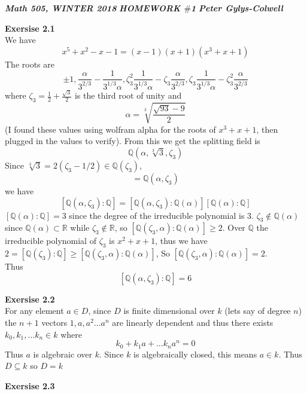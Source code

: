 \documentclass[12pt]{article}
\newenvironment{ques}[1]{\textbf{Exersise #1}\vspace{1 mm}\\ }{\bigskip}
\theoremstyle{definition}
\newcommand{\R}{\mathbb R}
\newcommand{\Q}{\mathbb Q}
\renewcommand{\a}{\alpha}
\begin{document}
\noindent \textit{\textbf{Math 505, WINTER 2018}} \hspace{1.3cm}
\textit{\textbf{HOMEWORK $\#$1}} \hspace{1.3cm} \textit{\textbf{Peter
Gylys-Colwell}} 

\vspace{1cm}

\begin{ques}{2.1}
	We have
	$$x^5 + x^2 - x - 1 = (x - 1)(x + 1)(x^3 + x + 1)$$
	The roots are 
	$$\pm 1, \frac{\a}{3^{2/3}} - \frac{1}{3^{1/3}\a},
	\zeta_3^2\frac{1}{3^{1/3}\a}-\zeta_3\frac{\a}{3^{2/3}},
	\zeta_3\frac{1}{3^{1/3}\a}-\zeta_3^2\frac{\a}{3^{2/3}}$$ 
	where
	$\zeta_3 = \frac 1 2 + \frac {\sqrt 3} {2}$ is the third root of unity and
	$$\a = \sqrt[3]{\frac{\sqrt{93} - 9}{2}}$$
	(I found these values using wolfram alpha for the roots of $x^3 + x + 1$,
	then plugged in the values to verify). From this we get the splitting field
	is $$\Q(\a, \sqrt[3] 3, \zeta_3)$$ Since $\sqrt[3] 3 = 2(\zeta_3 - 1/2) \in
	\Q(\zeta_3)$, $$= \Q(\a, \zeta_3)$$ we have $$[\Q(\a,\zeta_3) : \Q] =
	[\Q(\a,\zeta_3) : \Q(\a)][\Q(\a):\Q]$$ $[\Q(\a): \Q] = 3$ since the degree
	of the irreducible polynomial is 3.  $\zeta_3 \notin \Q(\a)$ since $\Q(\a)
	\subset \R$ while $\zeta_3 \notin \R$, so $[\Q(\zeta_3,\a) : \Q(\a)] \geq
	2$. Over $\Q$ the irreducible polynomial of $\zeta_3$ is $x^2 + x + 1$,
	thus we have $2 = [\Q(\zeta_3) : \Q] \geq [\Q(\zeta_3,\a) : \Q(\a)]$, So
	$[\Q(\zeta_3,\a):\Q(\a)] = 2$.\\ Thus
	$$[\Q(\a,\zeta_3):\Q] = 6$$
\end{ques}

\begin{ques}{2.2}
	For any element $a \in D$, since $D$ is finite dimensional over $k$ (lets
	say of degree $n$) the $n +1$ vectors $1, a, a^2 \dots a^n$ are linearly
	dependent and thus there exists $k_0, k_1, \dots k_n \in k$ where
	$$k_0 + k_1a + \dots k_na^n = 0$$
	Thus $a$ is algebraic over $k$. Since $k$ is algebraically closed, this
	means $a \in k$. Thus $D \subseteq k$ so $D = k$
\end{ques}

\begin{ques}{2.3}
\end{ques}
\end{document}
